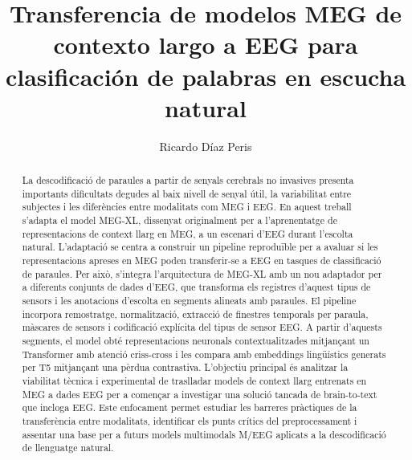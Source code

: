 \documentclass[11pt,spanish,listoffigures,listoftables]{tfgetsinf}
\title{Transferencia de modelos MEG de contexto largo a EEG para clasificación de palabras en escucha natural
}
\author{Ricardo Díaz Peris}
\begin{document}

\begin{abstract}
La descodificació de paraules a partir de senyals cerebrals no invasives presenta importants dificultats degudes al baix nivell de senyal útil, la variabilitat entre subjectes i les diferències entre modalitats com MEG i EEG. En aquest treball s’adapta el model MEG-XL, dissenyat originalment per a l'aprenentatge de representacions de context llarg en MEG, a un escenari d'EEG durant l'escolta natural. L'adaptació se centra a construir un pipeline reproduïble per a avaluar si les representacions apreses en MEG poden transferir-se a EEG en tasques de classificació de paraules.
Per això, s'integra l'arquitectura de MEG-XL amb un nou adaptador per a diferents conjunts de dades d’EEG, que transforma els registres d'aquest tipus de sensors i les anotacions d'escolta en segments alineats amb paraules. El pipeline incorpora remostratge, normalització, extracció de finestres temporals per paraula, màscares de sensors i codificació explícita del tipus de sensor EEG. A partir d'aquests segments, el model obté representacions neuronals contextualitzades mitjançant un Transformer amb atenció criss-cross i les compara amb embeddings lingüístics generats per T5 mitjançant una pèrdua contrastiva.
L'objectiu principal és analitzar la viabilitat tècnica i experimental de traslladar models de context llarg entrenats en MEG a dades EEG per a començar a investigar una solució tancada de brain-to-text que incloga EEG. Este enfocament permet estudiar les barreres pràctiques de la transferència entre modalitats, identificar els punts crítics del preprocessament i assentar una base per a futurs models multimodals M/EEG aplicats a la descodificació de llenguatge natural.
\end{abstract}
\end{document}
